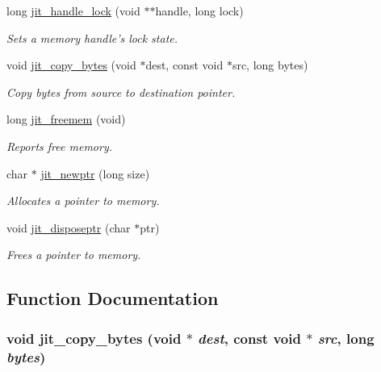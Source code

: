 \begin{DoxyCompactItemize}
long \hyperlink{group__memorymod_ga8beac43ecbe453e810b373739bbf1483}{jit\_\-handle\_\-lock} (void $\ast$$\ast$handle, long lock)
\begin{DoxyCompactList}\small\item\em Sets a memory handle's lock state. \item\end{DoxyCompactList}\item 
void \hyperlink{group__memorymod_ga84ae88848dbd4c60b8e368773ac0ca92}{jit\_\-copy\_\-bytes} (void $\ast$dest, const void $\ast$src, long bytes)
\begin{DoxyCompactList}\small\item\em Copy bytes from source to destination pointer. \item\end{DoxyCompactList}\item 
long \hyperlink{group__memorymod_gad1723114dcc67cbb24e45cb59aa0bb4f}{jit\_\-freemem} (void)
\begin{DoxyCompactList}\small\item\em Reports free memory. \item\end{DoxyCompactList}\item 
char $\ast$ \hyperlink{group__memorymod_ga7c7f1fc4d1e935c154eb285c9216623b}{jit\_\-newptr} (long size)
\begin{DoxyCompactList}\small\item\em Allocates a pointer to memory. \item\end{DoxyCompactList}\item 
void \hyperlink{group__memorymod_gaa5a4969fb76823dd0c3a679a5bd01222}{jit\_\-disposeptr} (char $\ast$ptr)
\begin{DoxyCompactList}\small\item\em Frees a pointer to memory. \item\end{DoxyCompactList}\end{DoxyCompactItemize}


\subsection{Function Documentation}
\hypertarget{group__memorymod_ga84ae88848dbd4c60b8e368773ac0ca92}{
\subsubsection[{jit\_\-copy\_\-bytes}]{\setlength{\rightskip}{0pt plus 5cm}void jit\_\-copy\_\-bytes (void $\ast$ {\em dest}, \/  const void $\ast$ {\em src}, \/  long {\em bytes})}}
\label{group__memorymod_ga84ae88848dbd4c60b8e368773ac0ca92}


